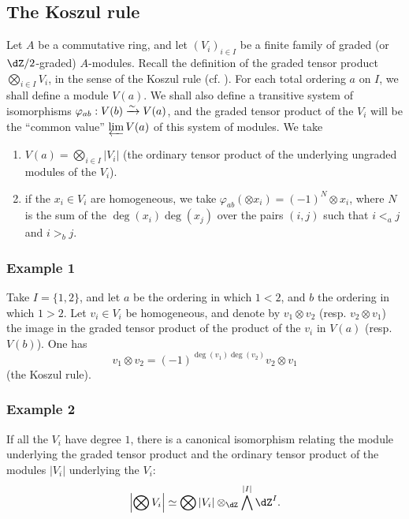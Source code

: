 \subsection{The Koszul rule}\label{IV:1-3}

Let $A$ be a commutative ring, and let $(V_i)_{i\in I}$ be a finite family of
graded (or $\dZ/2$-graded) $A$-modules. Recall the definition of the graded
tensor product $\bigotimes_{i\in I} V_i$, in the sense of the Koszul rule
(cf. \cite[XVII 1.1]{sga4}). For each total ordering $a$ on $I$, we shall
define a module $V(a)$. We shall also define a transitive system of
isomorphisms $\varphi_{a b}:V(b)\xrightarrow\sim V(a)$, and the graded tensor product of
the $V_i$ will be the ``common value'' $\varprojlim V(a)$ of this system of
modules. We take
\begin{enumerate}[\indent a)]
  \item $V(a) = \bigotimes_{i\in I} |V_i|$ (the ordinary tensor product of
    the underlying ungraded modules of the $V_i$).
  \item if the $x_i\in V_i$ are homogeneous, we take
    $\varphi_{a b}(\otimes x_i) = (-1)^N \otimes x_i$, where $N$ is the sum
    of the $\deg(x_i)\deg(x_j)$ over the pairs $(i,j)$ such that
    $i<_a j$ and $i>_b j$.
\end{enumerate}






\subsubsection*{\hypertarget{sga4half.e04.example.1-3-1}{Example 1}}

Take $I=\{1,2\}$, and let $a$ be the ordering in which $1<2$, and $b$ the
ordering in which $1>2$. Let $v_i\in V_i$ be homogeneous, and denote by
$v_1\otimes v_2$ (resp. $v_2\otimes v_1$) the image in the graded tensor
product of the product of the $v_i$ in $V(a)$ (resp. $V(b)$). One has
\[
  v_1\otimes v_2 = (-1)^{\deg(v_1)\deg(v_2)} v_2\otimes v_1
\]
(the Koszul rule).






\subsubsection*{\hypertarget{sga4half.e04.example.1-3-2}{Example 2}}

If all the $V_i$ have degree $1$, there is a canonical isomorphism relating
the module underlying the graded tensor product and the ordinary tensor
product of the modules $|V_i|$ underlying the $V_i$:
\[
  \left|\bigotimes V_i\right| \simeq \bigotimes |V_i|\otimes_{\dZ}\bigwedge^{|I|}\dZ^I \text{.}
\]






